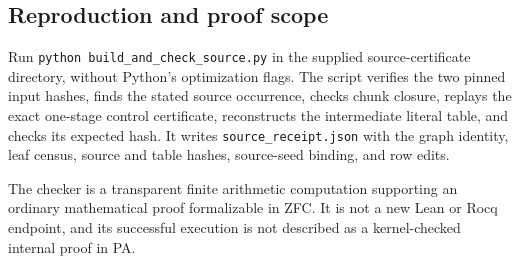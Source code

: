 \subsection{Reproduction and proof scope}

Run \texttt{python build\_and\_check\_source.py} in the supplied source-certificate
directory, without Python's optimization flags.  The script verifies the two
pinned input hashes, finds the stated source occurrence, checks chunk closure,
replays the exact one-stage control certificate, reconstructs the intermediate
literal table, and checks its expected hash.  It writes
\texttt{source\_receipt.json} with the graph identity, leaf census, source and
table hashes, source-seed binding, and row edits.

The checker is a transparent finite arithmetic computation supporting an
ordinary mathematical proof formalizable in ZFC.  It is not a new Lean or Rocq
endpoint, and its successful execution is not described as a kernel-checked
internal proof in PA.

